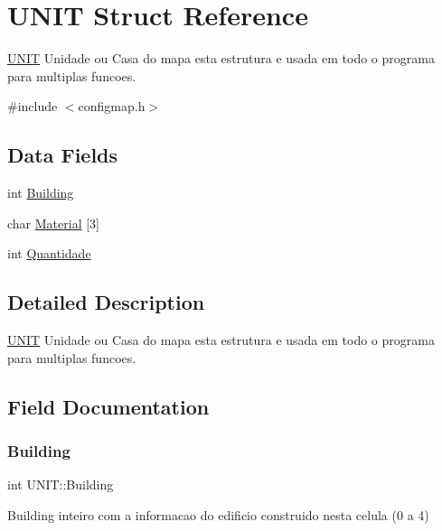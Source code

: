 \hypertarget{struct_u_n_i_t}{}\section{U\+N\+IT Struct Reference}
\label{struct_u_n_i_t}


\mbox{\hyperlink{struct_u_n_i_t}{U\+N\+IT}} Unidade ou Casa do mapa esta estrutura e usada em todo o programa para multiplas funcoes.  




{\ttfamily \#include $<$configmap.\+h$>$}

\subsection*{Data Fields}
\begin{DoxyCompactItemize}
\item 
int \mbox{\hyperlink{struct_u_n_i_t_ae9c30c2033387371329a35aa7c628ebc}{Building}}
\item 
char \mbox{\hyperlink{struct_u_n_i_t_a8e11b1a42f3f380755b3864a45a13df9}{Material}} \mbox{[}3\mbox{]}
\item 
int \mbox{\hyperlink{struct_u_n_i_t_a1878ea7b1f85a363ffd2ceeefff6e1ee}{Quantidade}}
\end{DoxyCompactItemize}


\subsection{Detailed Description}
\mbox{\hyperlink{struct_u_n_i_t}{U\+N\+IT}} Unidade ou Casa do mapa esta estrutura e usada em todo o programa para multiplas funcoes. 

\subsection{Field Documentation}
\mbox{\label{struct_u_n_i_t_ae9c30c2033387371329a35aa7c628ebc}} 
\subsubsection{\texorpdfstring{Building}{Building}}
{\footnotesize\ttfamily int U\+N\+I\+T\+::\+Building}

Building inteiro com a informacao do edificio construido nesta celula (0 a 4) \mbox{\label{struct_u_n_i_t_a8e11b1a42f3f380755b3864a45a13df9}} 
